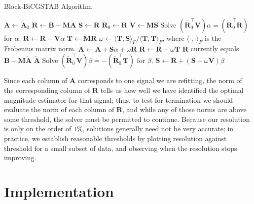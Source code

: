 \begin{algorithm}
\caption{Block-BiCGSTAB Algorithm}
\label{alg:BlBiCGSTAB}
\begin{algorithmic}[1]
\STATE $\mathbf{\widetilde{A}} \gets \mathbf{\widetilde{A}}_0$
\STATE $\mathbf{R} \gets \mathbf{B}-\mathbf{M\widetilde{A}}$ \label{algline:MatrixMul1}
\STATE $\mathbf{S} \gets \mathbf{R}$
\STATE $\mathbf{\widetilde{R}}_0 \gets \mathbf{R}$
\LOOP
  \STATE $\mathbf{V} \gets \mathbf{M}\mathbf{S}$ \label{algline:MatrixMul2}
  \STATE Solve $(\mathbf{\widetilde{R}}_0^\top \mathbf{V})\alpha = (\mathbf{\widetilde{R}}_0^\top \mathbf{R})$ for $\alpha$. \label{algline:BlBiCGSTAB_alpha}
  \STATE $\mathbf{R} \gets \mathbf{R} - \mathbf{V}\alpha$
  \STATE $\mathbf{T} \gets \mathbf{M}\mathbf{R}$ \label{algline:MatrixMul3}
  \STATE $\omega \gets {\langle \mathbf{T},\mathbf{S}\rangle_F} / {\langle \mathbf{T},\mathbf{T}\rangle_F} $, where $\langle\cdot,\cdot\rangle_F$ is the Frobenius matrix norm.
  \STATE $\mathbf{\widetilde{A}} \gets \mathbf{\widetilde{A}} + \mathbf{S}\alpha + \omega \mathbf{R}$
  \STATE $\mathbf{R} \gets \mathbf{R} - \omega \mathbf{T}$
  \STATE $\mathbf{R}$ currently equals $\mathbf{B}-\mathbf{M\widetilde{A}}$
    \RETURN $\mathbf{\widetilde{A}}$
  \ENDIF
  \STATE Solve $(\mathbf{\widetilde{R}}_0^\top \mathbf{V})\beta = -(\mathbf{\widetilde{R}}_0^\top \mathbf{T})$ for $\beta$. \label{algline:BlBiCGSTAB_beta}
  \STATE $\mathbf{S} \gets \mathbf{R} + (\mathbf{S} - \omega \mathbf{V}) \beta$
\ENDLOOP
\end{algorithmic}
\end{algorithm}

Since each column of $\mathbf{\widetilde{A}}$ corresponds to one signal we are refitting, the norm of the corresponding column of $\mathbf{R}$ tells us how well we have identified the optimal magnitude estimator for that signal; thus, to test for termination we should evaluate the norm of each column of $\mathbf{R}$, and while any of those norms are above some threshold, the solver must be permitted to continue.  Because our resolution is only on the order of $1\%$, solutions generally need not be very accurate; in practice, we establish reasonable thresholds by plotting resolution against threshold for a small subset of data, and observing when the resolution stops improving.

\section{Implementation}

